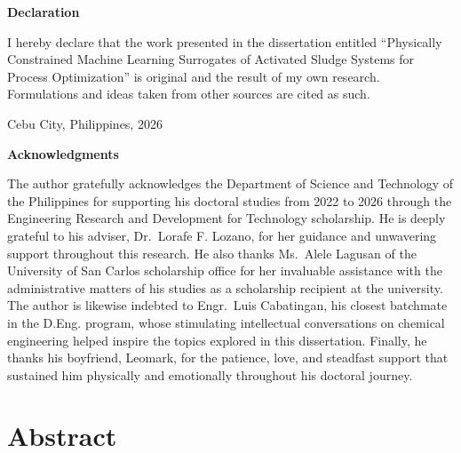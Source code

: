 \documentclass[12pt,twoside]{book}
\makeatletter
\newcommand{\@singlepar@cr}[1][]{\unskip\space\ignorespaces}
\newenvironment{singlepar}{%
  \def\par{\unskip\space\ignorespaces}%
  \def\newline{\unskip\space\ignorespaces}%
  \renewcommand{\\}{\@ifstar{\@singlepar@cr}{\@singlepar@cr}}%
  \ignorespaces
}{\endgraf}
\newcommand{\thesisYear}{2026}
\newcommand{\thesisTitle}{Physically Constrained Machine Learning Surrogates of Activated Sludge Systems for Process Optimization}
\newcommand{\thesisAuthor}{Egberto F. Selerio Jr.}
\newcommand{\thesisPlace}{Cebu City, Philippines}
\makeatother
\begin{document}

\newpage
\pagestyle{plain}

\null
\vfill
{\noindent\bf Declaration}

\begin{singlepar}
    I hereby declare that the work presented in the dissertation entitled \enquote{\thesisTitle} is original
    and the result of my own research. Formulations and ideas taken from other sources are cited as such.
\end{singlepar}

\vspace{3em}

\noindent\thesisPlace, \thesisYear \hfill \makebox[15em]{\hrulefill}
\par\noindent\hfill\makebox[15em][c]{\thesisAuthor}



\newpage
\pagestyle{plain}

\null
\vfill
{\noindent\bf Acknowledgments}

The author gratefully acknowledges the Department of Science and Technology of the Philippines for
supporting his doctoral studies from 2022 to 2026 through the Engineering Research and Development for
Technology scholarship. He is deeply grateful to his adviser, Dr.~Lorafe F. Lozano, for her guidance and
unwavering support throughout this research. He also thanks Ms.~Alele Lagusan of the University of San Carlos scholarship office for her
invaluable assistance with the administrative matters of his studies as a scholarship recipient at the university. The author is
likewise indebted to Engr.~Luis Cabatingan, his closest batchmate in the D.Eng. program, whose stimulating
intellectual conversations on chemical engineering helped inspire the topics explored in this dissertation.
Finally, he thanks his boyfriend, Leomark, for the patience, love, and steadfast support that sustained him
physically and emotionally throughout his doctoral journey.



\cleardoublepage
\chapter*{Abstract}
\end{document}

